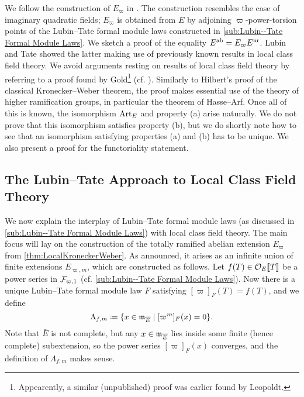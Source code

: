 \documentclass[../main.tex]{subfiles}
\begin{document}
We follow the construction of $E_\varpi$ in \cite{LubinTateFormalMult}.
The construction resembles the case of imaginary quadratic fields; $E_\varpi$ is
obtained from $E$ by adjoining $\varpi$-power-torsion points of the Lubin--Tate
formal module laws constructed in \cref{sub:Lubin--Tate Formal Module Laws}. 
We sketch a proof of the equality $E^{\mathrm{ab}} = E_\varpi E^{\mathrm{nr}}$. Lubin and Tate
showed the latter
making use of previously known results in local class field theory.
We avoid arguments resting on results of local class field theory
by referring to a proof found by Gold\footnote{Appearently, a similar
(unpublished) proof was earlier found by Leopoldt.} (cf. \cite{gold1981local}).
Similarly to Hilbert's proof of the classical Kronecker--Weber theorem,
the proof makes essential use of the theory of higher ramification groups,
in particular the theorem of Hasse--Arf. 
Once all of this is known, the isomorphism $\operatorname{Art}_E$ and property
(a) arise naturally. We do not prove that this isomorphism satisfies property
(b), but we do shortly note how to see that an isomorphism satisfying properties
(a) and (b) has to be unique. We also present a proof for the functoriality statement.


\subsection{The Lubin--Tate Approach to Local Class Field Theory} %
\label{sub:Construction of the Maximal Abelian Extension}
We now explain the interplay of Lubin--Tate formal module laws (as discussed
in \cref{sub:Lubin--Tate Formal Module Laws}) with 
local class field theory. The main focus will lay on the construction of the
totally ramified abelian extension $E_\varpi$ from
\cref{thm:LocalKroneckerWeber}. As announced, it 
arises as an infinite union of finite extensions $E_{\varpi, m}$, which
are constructed as follows. Let $f(T) \in \mathcal{O}_E\llbracket T \rrbracket$ be a power series
in $\mathcal{F}_{\varpi,1}$ (cf. \cref{sub:Lubin--Tate Formal Module Laws}). 
Now there is a unique Lubin--Tate formal module law $F$
satisfying $[\varpi]_F(T) = f(T)$, and we define
\begin{equation*}
  \Lambda_{f,m} \coloneqq \{x \in \mathfrak{m}_{\overline E} \mid [\varpi^m]_F(x) = 0\}.
\end{equation*}
Note that $\bar E$ is not complete, but any $x \in \mathfrak{m}_{\overline E}$ lies inside
some finite (hence
complete) subextension, so the power series $[\varpi]_F(x)$ converges, and the 
definition of $\Lambda_{f,m}$ makes sense.
\end{document}
